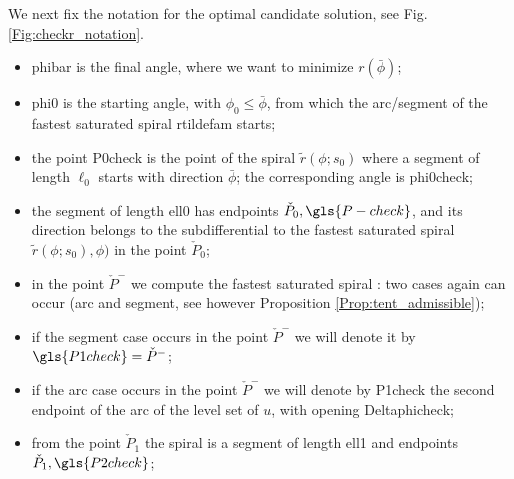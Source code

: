 \documentclass[reqno]{amsart}
\theoremstyle{definition} \newtheorem{definition}{Definition}[section]
\theoremstyle{definition} \newtheorem{remark}[definition]{Remark}
\theoremstyle{plain} \newtheorem{lemma}[definition]{Lemma}
\theoremstyle{plain} \newtheorem{proposition}[definition]{Proposition}
\theoremstyle{plain} \newtheorem{theorem}[definition]{Theorem}
\theoremstyle{plain} \newtheorem{corollary}[definition]{Corollary}
\theoremstyle{definition} \newtheorem{example}[definition]{Example}
\theoremstyle{plain} \newtheorem{claim}[clai]{Claim}
\theoremstyle{definition} \newtheorem{assumption}[definition]{Assumption}
\theoremstyle{definition} \newtheorem{observation}[definition]{Observation}
\newcommand{\1}{\mathbbm 1}
\numberwithin{equation}{section} %
\theoremstyle{plain} \newtheorem*{theorem*}{Theorem}
\theoremstyle{plain} \newtheorem{mthm}[maintheorem]{Main Theorem}
\theoremstyle{plain} \newtheorem*{mthm*}{Main Theorem}
\theoremstyle{plain} \newtheorem*{conjecture*}{Conjecture}
\theoremstyle{plain} \newtheorem{conjecture}[definition]{Conjecture}
\theoremstyle{plain} \newtheorem*{problem*}{Problem}
\begin{document}
We next fix the notation for the optimal candidate solution, see Fig. \ref{Fig:checkr_notation}.
\begin{itemize}
\item \gls{phibar} is the final angle, where we want to minimize $r(\bar \phi)$;
\item \gls{phi0} is the starting angle, with $\phi_0 \leq \bar\phi$, from which the arc/segment of the fastest saturated spiral \gls{rtildefam} starts;
\item the point  \gls{P0check} is the point of the spiral $\tilde r(\phi;s_0)$ where a segment of length $\ell_0$ starts with direction $\bar \phi$; the corresponding angle is  \gls{phi0check};
\item the segment of length  \gls{ell0} has endpoints  $\check P_0,\gls{P-check}$, and its direction belongs to the subdifferential to the fastest saturated spiral $\tilde r(\phi;s_0),\phi)$ in the point $\check P_0$;
\item in the point $\check P^{-}$ we compute the fastest saturated spiral%
: two cases again can occur (arc and segment, see however Proposition \ref{Prop:tent_admissible});
\item if the segment case occurs in the point $\check P^{-}$ we will denote it by  $\gls{P1check} = \check P^{-}$;
\item if the arc case occurs in the point $\check P^{-}$ we will denote by \gls{P1check} the second endpoint of the arc of the level set of $u$, with opening  \gls{Deltaphicheck};
\item from the point $\check P_1$ the spiral is a segment of length  \gls{ell1} and endpoints  $\check P_1,\gls{P2check}$;

\end{itemize}
\end{document}
